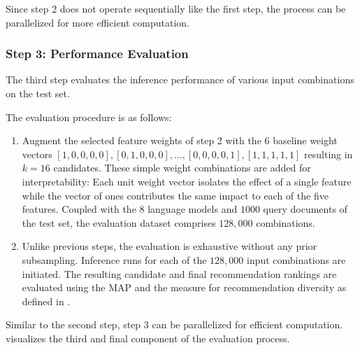 Since step 2 does not operate sequentially like the first step, the process can be parallelized for more efficient computation.


\subsubsection*{Step 3: Performance Evaluation}

The third step evaluates the inference performance of various input combinations on the test set.

The evaluation procedure is as follows:

\begin{enumerate}
    \item Augment the selected feature weights of step 2 with the $6$ baseline weight vectors $[1, 0, 0, 0, 0], [0, 1, 0, 0, 0], \ldots, [0, 0, 0, 0, 1], [1, 1, 1, 1, 1]$ resulting in $k=16$ candidates.
          These simple weight combinations are added for interpretability: Each unit weight vector isolates the effect of a single feature while the vector of ones contributes the same impact to each of the five features.
          Coupled with the $8$ language models and $1000$ query documents of the test set, the evaluation dataset comprises $128,000$ combinations.
    \item Unlike previous steps, the evaluation is exhaustive without any prior subsampling. Inference runs for each of the $128,000$ input combinations are initiated.
          The resulting candidate and final recommendation rankings are evaluated using the \ac{MAP} and the measure for recommendation diversity as defined in .
\end{enumerate}

Similar to the second step, step 3 can be parallelized for efficient computation.  visualizes the third and final component of the evaluation process.

